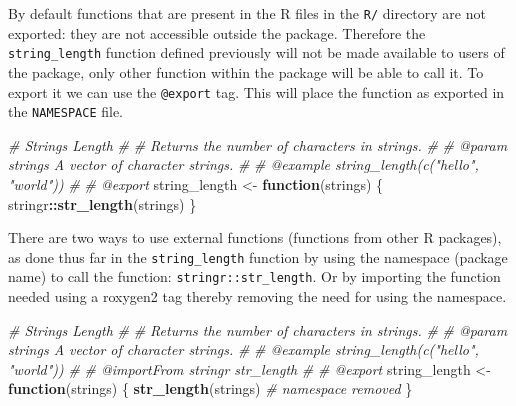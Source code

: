 \documentclass[
]{krantz}
\makeatletter
\newenvironment{Shaded}{\begin{snugshade}}{\end{snugshade}}
\newcommand{\CommentTok}[1]{\textcolor[rgb]{0.37,0.37,0.37}{\textit{#1}}}
\newcommand{\ControlFlowTok}[1]{\textcolor[rgb]{0.27,0.27,0.27}{\textbf{#1}}}
\newcommand{\KeywordTok}[1]{\textcolor[rgb]{0.27,0.27,0.27}{\textbf{#1}}}
\newcommand{\NormalTok}[1]{#1}
\newcommand{\OperatorTok}[1]{\textcolor[rgb]{0.43,0.43,0.43}{\textbf{#1}}}
\newcommand{\StringTok}[1]{\textcolor[rgb]{0.5,0.5,0.5}{#1}}
\newenvironment{kframe}{%
\medskip{}
\setlength{\fboxsep}{.8em}
 \def\at@end@of@kframe{}%
 \ifinner\ifhmode%
  \def\at@end@of@kframe{\end{minipage}}%
  \begin{minipage}{\columnwidth}%
 \fi\fi%
 \def\FrameCommand##1{\hskip\@totalleftmargin \hskip-\fboxsep
 \colorbox{shadecolor}{##1}\hskip-\fboxsep
     \hskip-\linewidth \hskip-\@totalleftmargin \hskip\columnwidth}%
 \MakeFramed {\advance\hsize-\width
   \@totalleftmargin\z@ \linewidth\hsize
   \@setminipage}}%
 {\par\unskip\endMakeFramed%
 \at@end@of@kframe}
\renewenvironment{Shaded}{\begin{kframe}}{\end{kframe}}
\makeatother
\begin{document}
By default functions that are present in the R files in the \texttt{R/} directory are not exported: they are not accessible outside the package. Therefore the \texttt{string\_length} function defined previously will not be made available to users of the package, only other function within the package will be able to call it. To export it we can use the \texttt{@export} tag. This will place the function as exported in the \texttt{NAMESPACE} file.

\begin{Shaded}
\begin{Highlighting}[]
\CommentTok{\#\textquotesingle{} Strings Length}
\CommentTok{\#\textquotesingle{} }
\CommentTok{\#\textquotesingle{} Returns the number of characters in strings. }
\CommentTok{\#\textquotesingle{} }
\CommentTok{\#\textquotesingle{} @param strings A vector of character strings.}
\CommentTok{\#\textquotesingle{} }
\CommentTok{\#\textquotesingle{} @example string\_length(c("hello", "world"))}
\CommentTok{\#\textquotesingle{} }
\CommentTok{\#\textquotesingle{} @export}
\NormalTok{string\_length <{-}}\StringTok{ }\ControlFlowTok{function}\NormalTok{(strings) \{}
\NormalTok{  stringr}\OperatorTok{::}\KeywordTok{str\_length}\NormalTok{(strings)}
\NormalTok{\}}
\end{Highlighting}
\end{Shaded}

There are two ways to use external functions (functions from other R packages), as done thus far in the \texttt{string\_length} function by using the namespace (package name) to call the function: \texttt{stringr::str\_length}. Or by importing the function needed using a roxygen2 tag thereby removing the need for using the namespace.

\begin{Shaded}
\begin{Highlighting}[]
\CommentTok{\#\textquotesingle{} Strings Length}
\CommentTok{\#\textquotesingle{} }
\CommentTok{\#\textquotesingle{} Returns the number of characters in strings. }
\CommentTok{\#\textquotesingle{} }
\CommentTok{\#\textquotesingle{} @param strings A vector of character strings.}
\CommentTok{\#\textquotesingle{} }
\CommentTok{\#\textquotesingle{} @example string\_length(c("hello", "world"))}
\CommentTok{\#\textquotesingle{} }
\CommentTok{\#\textquotesingle{} @importFrom stringr str\_length}
\CommentTok{\#\textquotesingle{} }
\CommentTok{\#\textquotesingle{} @export}
\NormalTok{string\_length <{-}}\StringTok{ }\ControlFlowTok{function}\NormalTok{(strings) \{}
  \KeywordTok{str\_length}\NormalTok{(strings) }\CommentTok{\# namespace removed}
\NormalTok{\}}
\end{Highlighting}
\end{Shaded}
\end{document}
